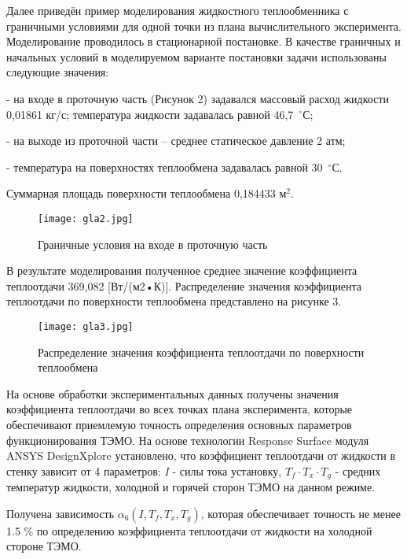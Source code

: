 Далее приведён пример моделирования жидкостного те\-плообменника с граничными условиями
для одной точки из плана вычислительного эксперимента.
Моделирование проводилось в стационарной постановке.
В качестве граничных и начальных условий в моделируемом варианте постановки задачи использованы следующие значения:

- на входе в проточную часть (Рисунок 2) задавался массовый расход жидкости 0,01861 кг/с;
температура жидкости задавалась равной 46,7~$^\circ$С;

- на выходе из проточной части – среднее статическое давление 2 атм;

- температура на поверхностях теплообмена задавалась равной 30~$^\circ$С.

Суммарная площадь поверхности теплообмена 0,184433 м$^2$.

\begin{figure}[h!]
	\centering
	\texttt{[image: gla2.jpg]}
	\caption{Граничные условия на входе в проточную часть}
\end{figure}

В результате моделирования полученное среднее значение коэффициента теплоотдачи 369,082 [Вт/(м2•К)]. Распределение значения коэффициента теплоотдачи по поверхности теплообмена представлено на рисунке 3.

\begin{figure}[h!]
	\centering
	\texttt{[image: gla3.jpg]}
	\caption{Распределение значения коэффициента теплоотдачи по поверхности теплообмена}
\end{figure}


На основе обработки экспериментальных данных получены значения коэффициента теплоотдачи во всех точках плана эксперимента,
которые обеспечивают приемлемую то\-ч\-ность определения основных параметров функционирования ТЭМО.
На основе технологии Response Surface модуля ANSYS DesignXplore установлено,
что коэффициент теплоотдачи от жидкости в стенку зависит от 4 параметров:
\textit{I} - силы тока установку, $T_{f} \cdot T_{x} \cdot T_{g} $ - средних температур жидкости, холодной и горячей сторон ТЭМО на данном режиме.

Получена зависимость $\alpha _{6} (I,T_{f} ,T_{x} ,T_{g} )$, которая обеспечивает точность не менее 1.5 \% по определению коэффициента теплоотдачи от жидкости на холодной стороне ТЭМО.

